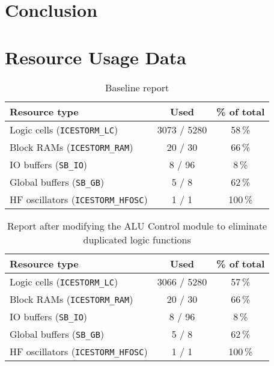 \documentclass[a4paper,10pt]{article}
\begin{document}
\section{Conclusion}
\label{sec:Conclusion}

\newpage
\appendix
\section{Resource Usage Data}

\begin{table}[H] 
    \centering
    \begin{tabularx}{0.6\textwidth}{X c c}
        \toprule
        Resource type & Used & \% of total \\ \midrule
        Logic cells (\texttt{ICESTORM\_LC}) & 3073 / 5280 & 58\,\% \\
        Block RAMs (\texttt{ICESTORM\_RAM}) & 20 / 30 & 66\,\% \\
        IO buffers (\texttt{SB\_IO}) & 8 / 96 & 8\,\% \\
        Global buffers (\texttt{SB\_GB}) & 5 / 8 & 62\,\% \\
        HF oscillators (\texttt{ICESTORM\_HFOSC}) & 1 / 1 & 100\,\% \\
        \bottomrule
    \end{tabularx}
    \caption{Baseline report}
    \label{tab:baseline}
\end{table}

\begin{table}[H] 
    \centering
    \begin{tabularx}{0.6\textwidth}{X c c}
        \toprule
        Resource type & Used & \% of total \\ \midrule
        Logic cells (\texttt{ICESTORM\_LC}) & 3066 / 5280 & 57\,\% \\
        Block RAMs (\texttt{ICESTORM\_RAM}) & 20 / 30 & 66\,\% \\
        IO buffers (\texttt{SB\_IO}) & 8 / 96 & 8\,\% \\
        Global buffers (\texttt{SB\_GB}) & 5 / 8 & 62\,\% \\
        HF oscillators (\texttt{ICESTORM\_HFOSC}) & 1 / 1 & 100\,\% \\
        \bottomrule
    \end{tabularx}
    \caption{Report after modifying the ALU Control module
    to eliminate duplicated logic functions}
    \label{tab:ALU_Control}
\end{table}
\end{document}
